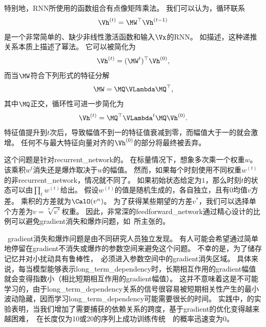 特别地，\gls{RNN}所使用的函数组合有点像矩阵乘法。
我们可以认为，循环联系
\begin{align}
 \Vh^{(t)} = \MW^\top \Vh^{(t-1)}
\end{align}
是一个非常简单的、缺少非线性激活函数和输入$\Vx$的\gls{RNN}。
如描述，这种递推关系本质上描述了幂法。
它可以被简化为
\begin{align}
 \Vh^{(t)} = (\MW^t)^\top \Vh^{(0)},
\end{align}
而当$\MW$符合下列形式的特征分解
\begin{align}
 \MW = \MQ \VLambda \MQ^\top,
\end{align}
其中$\MQ$正交，循环性可进一步简化为
\begin{align}
 \Vh^{(t)} = \MQ^\top \VLambda^t \MQ \Vh^{(0)}.
\end{align}
特征值提升到$t$次后，导致幅值不到一的特征值衰减到零，而幅值大于一的就会激增。
任何不与最大特征向量对齐的$\Vh^{(0)}$的部分将最终被丢弃。


这个问题是针对\gls{recurrent_network}的。
在标量情况下，想象多次乘一个权重$w$。
该乘积$w^t$消失还是爆炸取决于$w$的幅值。
然而，如果每个时刻使用不同权重$w^{(t)}$的非\gls{recurrent_network}，情况就不同了。
如果初始状态给定为$1$，那么时刻$t$的状态可以由$\prod_t w^{(t)}$给出。
假设$w^{(t)}$的值是随机生成的，各自独立，且有$0$均值$v$方差。
乘积的方差就为$\CalO(v^n)$。
为了获得某些期望的方差$v^*$，我们可以选择单个方差为$v=\sqrt[n]{v^*}$权重。
因此，非常深的\gls{feedforward_network}通过精心设计的比例可以避免\gls{gradient}消失和爆炸问题，如~\cite{Sussillo14}所主张的。


~\gls{gradient}消失和爆炸问题是由不同研究人员独立发现\citep{Hochreiter91,Bengio_icnn93,Bengio1994ITNN}。
有人可能会希望通过简单地停留在\gls{gradient}不消失或爆炸的参数空间来避免这个问题。
不幸的是，为了储存记忆并对小扰动具有鲁棒性，~必须进入参数空间中的\gls{gradient}消失区域\citep{Bengio_icnn93,Bengio1994ITNN}。
具体来说，每当模型能够表示\gls{long_term_dependency}时，长期相互作用的\gls{gradient}幅值就会变得指数小（相比短期相互作用的\gls{gradient}幅值）。
这并不意味着这是不可能学习的，由于\gls{long_term_dependency}关系的信号很容易被短期相关性产生的最小波动隐藏，因而学习\gls{long_term_dependency}可能需要很长的时间。
实践中，\cite{Bengio1994ITNN}的实验表明，当我们增加了需要捕获的依赖关系的跨度，基于\gls{gradient}的优化变得越来越困难，~在长度仅为10或20的序列上成功训练传统~~的概率迅速变为0。

